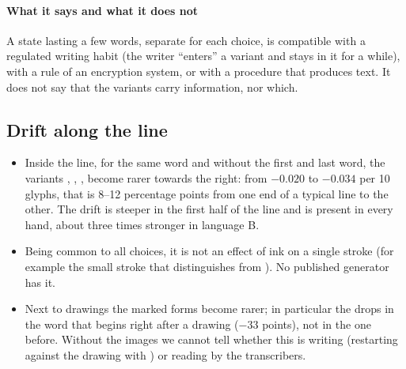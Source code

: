 \paragraph{What it says and what it does not}
A state lasting a few words, separate for each choice, is compatible with a regulated writing habit (the writer ``enters''
a variant and stays in it for a while), with a rule of an encryption system, or with a procedure that produces text. It
does not say that the variants carry information, nor which.

\subsection{Drift along the line}

\begin{itemize}
\item Inside the line, for the same word and without the first and last word, the variants , , ,
   become rarer towards the right: from $-0.020$ to $-0.034$ per 10 glyphs, that is 8--12 percentage points from
  one end of a typical line to the other. The drift is steeper in the first half of the line and is present in every
  hand, about three times stronger in language B.
\item Being common to all choices, it is not an effect of ink on a single stroke (for example the small stroke that
  distinguishes  from ). No published generator has it.
\item Next to drawings the marked forms become rarer; in particular the  drops in the word that begins right after
  a drawing ($-33$ points), not in the one before. Without the images we cannot tell whether this is writing (restarting
  against the drawing with ) or reading by the transcribers.
\end{itemize}
